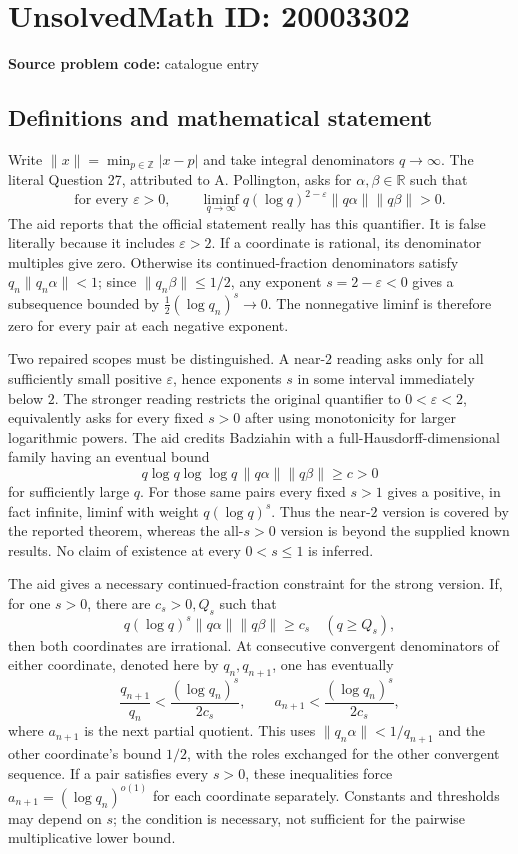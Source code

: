 \documentclass[11pt]{article}
\newcommand{\Z}{\mathbb{Z}}
\newcommand{\R}{\mathbb{R}}
\newcommand{\eps}{\varepsilon}
\begin{document}
\section*{UnsolvedMath ID: 20003302}
\textbf{Source problem code:} catalogue entry
\subsection{Definitions and mathematical statement}
Write $\|x\|=\min_{p\in\Z}|x-p|$ and take integral denominators $q\to\infty$. The literal Question 27, attributed to A. Pollington, asks for $\alpha,\beta\in\R$ such that
\[
 \text{for every }\eps>0,\qquad
 \liminf_{q\to\infty}q(\log q)^{2-\eps}
                  \|q\alpha\|\|q\beta\|>0.
\]
The aid reports that the official statement really has this quantifier. It is false literally because it includes $\eps>2$. If a coordinate is rational, its denominator multiples give zero. Otherwise its continued-fraction denominators satisfy $q_n\|q_n\alpha\|<1$; since $\|q_n\beta\|\leq1/2$, any exponent $s=2-\eps<0$ gives a subsequence bounded by $\frac12(\log q_n)^s\to0$. The nonnegative liminf is therefore zero for every pair at each negative exponent.

Two repaired scopes must be distinguished. A near-$2$ reading asks only for all sufficiently small positive $\eps$, hence exponents $s$ in some interval immediately below $2$. The stronger reading restricts the original quantifier to $0<\eps<2$, equivalently asks for every fixed $s>0$ after using monotonicity for larger logarithmic powers. The aid credits Badziahin with a full-Hausdorff-dimensional family having an eventual bound
\[
 q\log q\log\log q\,\|q\alpha\|\|q\beta\|\geq c>0
\]
for sufficiently large $q$. For those same pairs every fixed $s>1$ gives a positive, in fact infinite, liminf with weight $q(\log q)^s$. Thus the near-$2$ version is covered by the reported theorem, whereas the all-$s>0$ version is beyond the supplied known results. No claim of existence at every $0<s\leq1$ is inferred.

The aid gives a necessary continued-fraction constraint for the strong version. If, for one $s>0$, there are $c_s>0,Q_s$ such that
\[
 q(\log q)^s\|q\alpha\|\|q\beta\|\geq c_s
                 \quad(q\geq Q_s),
\]
then both coordinates are irrational. At consecutive convergent denominators of either coordinate, denoted here by $q_n,q_{n+1}$, one has eventually
\[
 \frac{q_{n+1}}{q_n}<\frac{(\log q_n)^s}{2c_s},\qquad
 a_{n+1}<\frac{(\log q_n)^s}{2c_s},
\]
where $a_{n+1}$ is the next partial quotient. This uses $\|q_n\alpha\|<1/q_{n+1}$ and the other coordinate's bound $1/2$, with the roles exchanged for the other convergent sequence. If a pair satisfies every $s>0$, these inequalities force $a_{n+1}=(\log q_n)^{o(1)}$ for each coordinate separately. Constants and thresholds may depend on $s$; the condition is necessary, not sufficient for the pairwise multiplicative lower bound.
\end{document}
